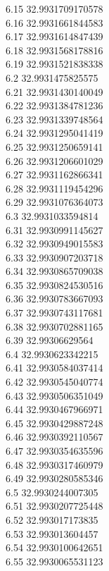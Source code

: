 {6.15	32.9931709170578\\
6.16	32.9931661844583\\
6.17	32.9931614847439\\
6.18	32.9931568178816\\
6.19	32.9931521838338\\
6.2	32.9931475825575\\
6.21	32.9931430140049\\
6.22	32.9931384781236\\
6.23	32.9931339748564\\
6.24	32.9931295041419\\
6.25	32.9931250659141\\
6.26	32.9931206601029\\
6.27	32.9931162866341\\
6.28	32.9931119454296\\
6.29	32.9931076364073\\
6.3	32.9931033594814\\
6.31	32.9930991145627\\
6.32	32.9930949015583\\
6.33	32.9930907203718\\
6.34	32.9930865709038\\
6.35	32.9930824530516\\
6.36	32.9930783667093\\
6.37	32.9930743117681\\
6.38	32.9930702881165\\
6.39	32.99306629564\\
6.4	32.9930623342215\\
6.41	32.9930584037414\\
6.42	32.9930545040774\\
6.43	32.9930506351049\\
6.44	32.9930467966971\\
6.45	32.9930429887248\\
6.46	32.9930392110567\\
6.47	32.9930354635596\\
6.48	32.9930317460979\\
6.49	32.9930280585346\\
6.5	32.9930244007305\\
6.51	32.9930207725448\\
6.52	32.993017173835\\
6.53	32.993013604457\\
6.54	32.9930100642651\\
6.55	32.9930065531123\\
}
